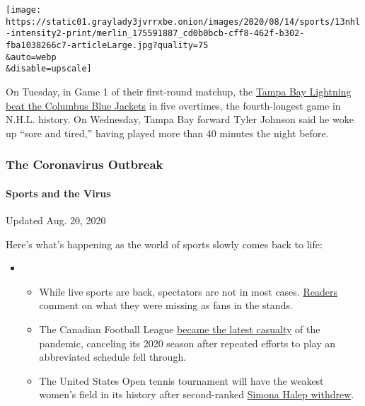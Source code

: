 \texttt{[image: https://static01.graylady3jvrrxbe.onion/images/2020/08/14/sports/13nhl-intensity2-print/merlin\_175591887\_cd0b0bcb-cff8-462f-b302-fba1038266c7-articleLarge.jpg?quality=75\\\&auto=webp\\\&disable=upscale]}

On Tuesday, in Game 1 of their first-round matchup, the
\href{https://www.nytimes3xbfgragh.onion/2020/08/12/sports/hockey/longest-nhl-game-lightning-bluejackets.html}{Tampa
Bay Lightning beat the Columbus Blue Jackets} in five overtimes, the
fourth-longest game in N.H.L. history. On Wednesday, Tampa Bay forward
Tyler Johnson said he woke up ``sore and tired,'' having played more
than 40 minutes the night before.

\hypertarget{the-coronavirus-outbreak}{%
\subsubsection{The Coronavirus
Outbreak}\label{the-coronavirus-outbreak}}

\hypertarget{sports-and-the-virus}{%
\paragraph{Sports and the Virus}\label{sports-and-the-virus}}

Updated Aug. 20, 2020

Here's what's happening as the world of sports slowly comes back to
life:

\begin{itemize}
\item
  \begin{itemize}
  \tightlist
  \item
    While live sports are back, spectators are not in most cases.
    \href{https://www.nytimes3xbfgragh.onion/2020/08/19/sports/empty-stadiums-live-fans.html?action=click\&pgtype=Article\&state=default\&region=MAIN_CONTENT_2\&context=storylines_keepup}{Readers}
    comment on what they were missing as fans in the stands.
  \item
    The Canadian Football League
    \href{https://www.nytimes3xbfgragh.onion/2020/08/18/sports/cfl-season-canceled.html?action=click\&pgtype=Article\&state=default\&region=MAIN_CONTENT_2\&context=storylines_keepup}{became
    the latest casualty} of the pandemic, canceling its 2020 season
    after repeated efforts to play an abbreviated schedule fell through.
  \item
    The United States Open tennis tournament will have the weakest
    women's field in its history after second-ranked
    \href{https://www.nytimes3xbfgragh.onion/2020/08/17/sports/tennis/us-open-women.html?action=click\&pgtype=Article\&state=default\&region=MAIN_CONTENT_2\&context=storylines_keepup}{Simona
    Halep withdrew}.
  \end{itemize}
\end{itemize}

